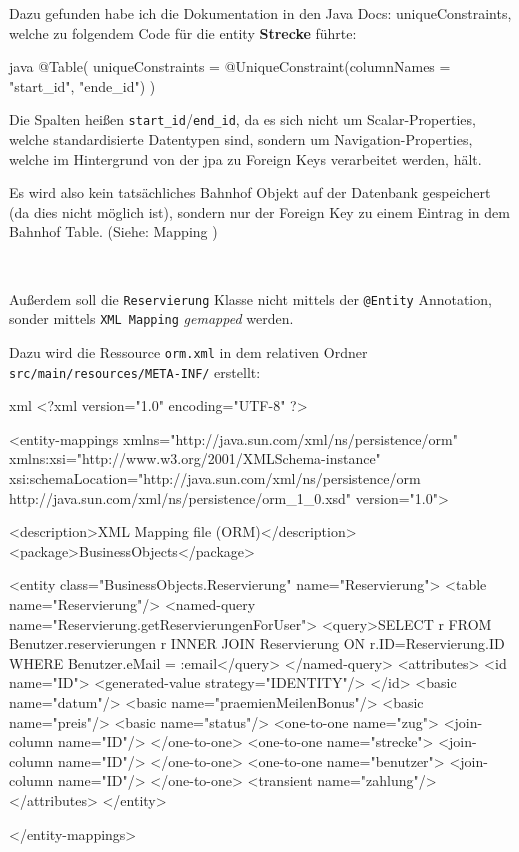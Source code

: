 Dazu gefunden habe ich die Dokumentation in den Java Docs: \gls{uniqueConstraints}, welche zu folgendem Code für die \gls{entity} \textbf{Strecke} führte:

\begin{code}{java}
@Table(
        uniqueConstraints = @UniqueConstraint(columnNames = {"start_id", "ende_id"})
)
\end{code}

Die Spalten heißen \texttt{start\_id}/\texttt{end\_id}, da es sich nicht um Scalar-Properties, welche standardisierte Datentypen sind, sondern um Navigation-Properties, welche im Hintergrund von der \gls{jpa} zu Foreign Keys verarbeitet werden, hält.

Es wird also kein tatsächliches Bahnhof Objekt auf der Datenbank gespeichert (da dies nicht möglich ist), sondern nur der Foreign Key zu einem Eintrag in dem Bahnhof Table. (Siehe: Mapping \cite{wiki:mapping})

\

Außerdem soll die \texttt{Reservierung} Klasse nicht mittels der \texttt{@Entity} Annotation, sonder mittels \texttt{XML Mapping} \textit{gemapped} werden.

Dazu wird die Ressource \texttt{orm.xml} in dem relativen Ordner \texttt{src/main/resources/META-INF/} erstellt:

\begin{code}{xml}
<?xml version="1.0" encoding="UTF-8" ?>

<entity-mappings xmlns="http://java.sun.com/xml/ns/persistence/orm"
                    xmlns:xsi="http://www.w3.org/2001/XMLSchema-instance"
                    xsi:schemaLocation="http://java.sun.com/xml/ns/persistence/orm
    http://java.sun.com/xml/ns/persistence/orm_1_0.xsd"
                    version="1.0">

    <description>XML Mapping file (ORM)</description>
    <package>BusinessObjects</package>

    <entity class="BusinessObjects.Reservierung" name="Reservierung">
        <table name="Reservierung"/>
        <named-query name="Reservierung.getReservierungenForUser">
            <query>SELECT r FROM Benutzer.reservierungen r INNER JOIN Reservierung ON r.ID=Reservierung.ID WHERE Benutzer.eMail = :email</query>
        </named-query>
        <attributes>
            <id name="ID">
                <generated-value strategy="IDENTITY"/>
            </id>
            <basic name="datum"/>
            <basic name="praemienMeilenBonus"/>
            <basic name="preis"/>
            <basic name="status"/>
            <one-to-one name="zug">
                <join-column name="ID"/>
            </one-to-one>
            <one-to-one name="strecke">
                <join-column name="ID"/>
            </one-to-one>
            <one-to-one name="benutzer">
                <join-column name="ID"/>
            </one-to-one>
            <transient name="zahlung"/>
        </attributes>
    </entity>

</entity-mappings>
\end{code}

